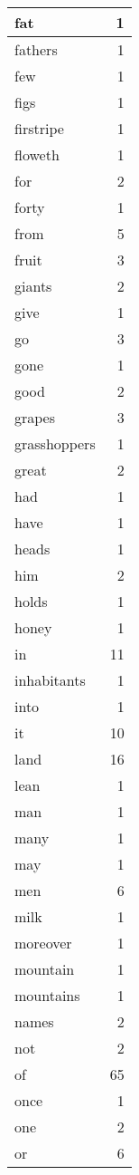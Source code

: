 \begin{center}
\begin{longtable}{l|r}
fat & 1\\ \hline 
fathers & 1\\ \hline 
few & 1\\ \hline 
figs & 1\\ \hline 
firstripe & 1\\ \hline 
floweth & 1\\ \hline 
for & 2\\ \hline 
forty & 1\\ \hline 
from & 5\\ \hline 
fruit & 3\\ \hline 
giants & 2\\ \hline 
give & 1\\ \hline 
go & 3\\ \hline 
gone & 1\\ \hline 
good & 2\\ \hline 
grapes & 3\\ \hline 
grasshoppers & 1\\ \hline 
great & 2\\ \hline 
had & 1\\ \hline 
have & 1\\ \hline 
heads & 1\\ \hline 
him & 2\\ \hline 
holds & 1\\ \hline 
honey & 1\\ \hline 
in & 11\\ \hline 
inhabitants & 1\\ \hline 
into & 1\\ \hline 
it & 10\\ \hline 
land & 16\\ \hline 
lean & 1\\ \hline 
man & 1\\ \hline 
many & 1\\ \hline 
may & 1\\ \hline 
men & 6\\ \hline 
milk & 1\\ \hline 
moreover & 1\\ \hline 
mountain & 1\\ \hline 
mountains & 1\\ \hline 
names & 2\\ \hline 
not & 2\\ \hline 
of & 65\\ \hline 
once & 1\\ \hline 
one & 2\\ \hline 
or & 6\\ \hline 

\end{longtable}
\end{center}
